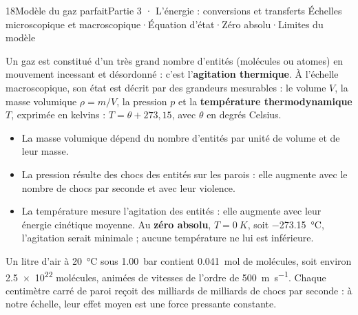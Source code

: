 \begin{ouverture}[gazparfait]{18}{Modèle du gaz parfait}{Partie 3 · L'énergie : conversions et transferts}
{Échelles microscopique et macroscopique\enspace·\enspace Équation d'état\enspace·\enspace Zéro absolu\enspace·\enspace Limites du modèle}
\end{ouverture}
\essentiel
{}
\begin{definition}
Un gaz est constitué d'un très grand nombre d'entités (molécules ou atomes) en mouvement incessant et désordonné :
c'est l'\textbf{agitation thermique}. À l'échelle macroscopique, son état est décrit par des grandeurs mesurables :
le volume $V$, la masse volumique $\rho=m/V$, la pression $p$ et la \textbf{température thermodynamique} $T$, exprimée en
kelvins : $T=\theta+273{,}15$, avec $\theta$ en degrés Celsius.
\end{definition}
\begin{propriete}
\begin{itemize}
\item La masse volumique dépend du nombre d'entités par unité de volume et de leur masse.
\item La pression résulte des chocs des entités sur les parois : elle augmente avec le nombre de chocs par seconde et
avec leur violence.
\item La température mesure l'agitation des entités : elle augmente avec leur énergie cinétique moyenne. Au
\textbf{zéro absolu}, $T=\qty{0}{K}$, soit \qty{-273,15}{\degreeCelsius}, l'agitation serait minimale ; aucune
température ne lui est inférieure.
\end{itemize}
\end{propriete}
\begin{exemple}
Un litre d'air à \qty{20}{\degreeCelsius} sous \qty{1,00}{bar} contient \qty{0,041}{mol} de molécules, soit environ
\num{2.5e22} molécules, animées de vitesses de l'ordre de \qty{500}{m.s^{-1}}. Chaque centimètre carré de paroi reçoit
des milliards de milliards de chocs par seconde : à notre échelle, leur effet moyen est une force pressante constante.
\end{exemple}
